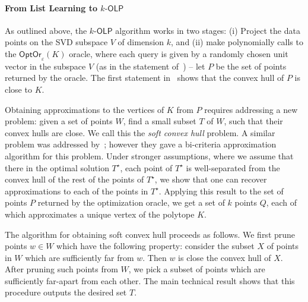 \documentclass[11pt,letterpaper]{article}
\newcommand{\olp}{{\mathsf {OLP}}\xspace}
\newcommand{\kolp}{k\mbox{-}\olp}
\newcommand{\opto}{{\mathsf{OptOr}}}
\begin{document}
\paragraph{From List Learning to $\kolp$}
%
%
%
As outlined above, the $\kolp$ algorithm works in two stages: (i) Project the data points on the SVD subspace $V$ of dimension $k$, and (ii) make polynomially calls to the $\opto_\varepsilon(K)$ oracle, where each query is given by a randomly chosen unit vector in the subspace $V$ (as in the statement of~) -- let $P$ be the set of points returned by the oracle. The first statement in~ shows that the convex hull of $P$ is close to $K$.  



Obtaining approximations to the vertices of $K$ from $P$ requires addressing a new problem: given a set of points $W$, find a small subset $T$ of $W$, such that their convex hulls are close. We call this the {\em soft convex hull} problem. A similar problem was addressed by~\cite{BlumHR19}; however they gave a bi-criteria approximation algorithm for this problem. Under stronger assumptions, where we assume that there in the optimal solution $T^\star$, each point of $T^\star$ is well-separated from the convex hull of the rest of the points of $T^\star$, we show that one can recover approximations to each of the points in $T^\star$. Applying this result to the set of points $P$ returned by the optimization oracle, we get a set of $k$ points $Q$, each of which approximates a unique vertex of the polytope $K$. 

The algorithm for obtaining soft convex hull proceeds as follows. We first prune points $w \in W$ which have the following property: consider the subset $X$ of points in $W$ which are sufficiently far from $w$. Then $w$ is close the convex hull of $X$. After pruning such points from $W$, we pick a subset of points which are sufficiently far-apart from each other. The main technical result shows that this procedure outputs the desired set $T$.
\end{document}
